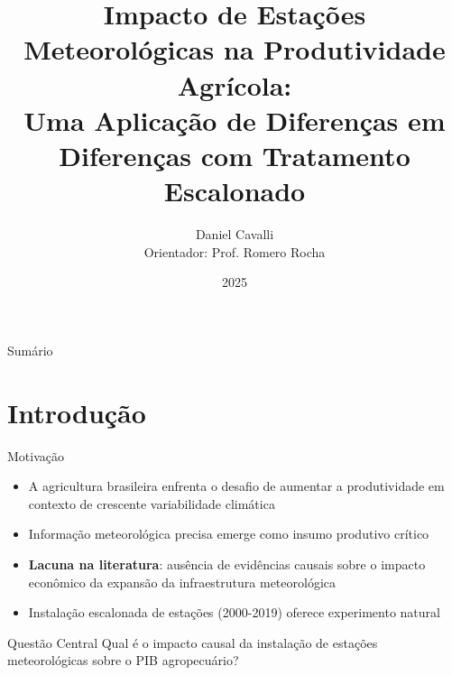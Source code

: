 \documentclass[10pt,aspectratio=169]{beamer}
\title[Estações Meteorológicas e Produtividade Agrícola]{Impacto de Estações Meteorológicas na Produtividade Agrícola: \\ Uma Aplicação de Diferenças em Diferenças com Tratamento Escalonado}
\author[Daniel Cavalli]{Daniel Cavalli \\ \small Orientador: Prof. Romero Rocha}
\institute[IE-UFRJ]{
  Instituto de Economia\\
  Universidade Federal do Rio de Janeiro
}
\date{2025}
\begin{document}
\begin{frame}
\titlepage
\end{frame}

\begin{frame}{Sumário}
\tableofcontents
\end{frame}

\section{Introdução}

\begin{frame}{Motivação}
\begin{itemize}
    \item A agricultura brasileira enfrenta o desafio de aumentar a produtividade em contexto de crescente variabilidade climática
    \vspace{0.3cm}
    \item Informação meteorológica precisa emerge como insumo produtivo crítico
    \vspace{0.3cm}
    \item \textbf{Lacuna na literatura}: ausência de evidências causais sobre o impacto econômico da expansão da infraestrutura meteorológica
    \vspace{0.3cm}
    \item Instalação escalonada de estações (2000-2019) oferece experimento natural
\end{itemize}

\begin{block}{Questão Central}
Qual é o impacto causal da instalação de estações meteorológicas sobre o PIB agropecuário?
\end{block}
\end{frame}
\end{document}
